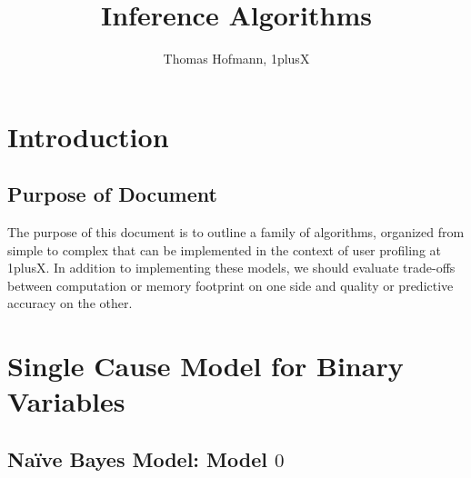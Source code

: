 \documentclass{article}
\title{Inference Algorithms}
\author{Thomas Hofmann, 1plusX}
\begin{document}
\maketitle 

\section{Introduction} 
\subsection{Purpose of Document}

The purpose of this document is to outline a family of algorithms, organized from simple to complex that can be implemented in the context of user profiling at 1plusX. In addition to implementing these models, we should evaluate trade-offs between computation or memory footprint on one side and quality or predictive accuracy on the other. 


\section{Single Cause Model for Binary Variables}

\subsection{Na\"ive Bayes Model: Model $0$} 
\end{document}
